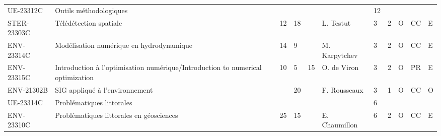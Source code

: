 \documentclass[a4paper,11pt]{article}
\begin{document}
{{\begin{tabular}{lllllllllll}
\rowcolor[HTML]{EFEFEF} 
UE-23312C                          & Outils méthodologiques                                                                                 &    &    &                           &                                    & 12   &                           &             &                            &                            \\
\rowcolor[HTML]{BBDAFF} 
STER-23303C                        & Télédétection spatiale                                                                                 & 12 & 18 &                           & L. Testut                          & 3    & 2                         & O           & CC                         & E                          \\
ENV-23314C                         & Modélisation numérique en hydrodynamique                                                               & 14 & 9  &                           & M. Karpytchev                      & 3    & 2                         & O           & CC                         & E                          \\
ENV-23315C                         & \cellcolor[HTML]{FD6864}Introduction à l'optimisation numérique/Introduction to numerical optimization & 10 & 5  & 15                        & O. de Viron                        & 3    & 2                         & O           & PR                         & E                          \\
\cellcolor[HTML]{FD6864}ENV-21302B & \cellcolor[HTML]{FD6864}SIG appliqué à l'environnement                                                 &    & 20 &                           & F. Rousseaux                       & 3    & 1                         & O           & CC                         & \cellcolor[HTML]{FD6864}O  \\
\rowcolor[HTML]{EFEFEF} 
UE-23314C                          & Problématiques littorales                                                                              &    &    &                           &                                    & 6    &                           &             &                            &                            \\
ENV-23310C                         & Problématiques littorales en géosciences                                                               & 25 & 15 &                           & E. Chaumillon                      & 6    & 2                         & O           & CC                         & E                          \\

\end{tabular}}}
\end{document}
